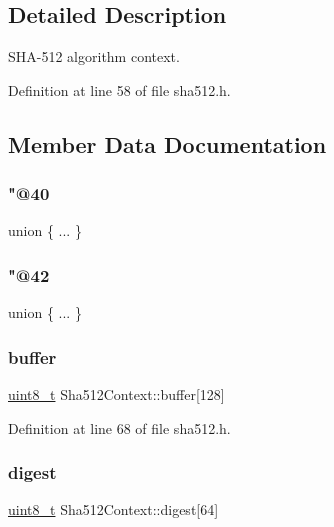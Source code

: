 \subsection{Detailed Description}
S\+H\+A-\/512 algorithm context. 

Definition at line 58 of file sha512.\+h.



\subsection{Member Data Documentation}
\mbox{\label{structSha512Context_ae58ba3548c1f12fa774f9316335b9272}} 
\subsubsection{\texorpdfstring{"@40}{@40}}
{\footnotesize\ttfamily union \{ ... \} }

\mbox{\label{structSha512Context_a4e5ca4c210ab1644179fec906141937e}} 
\subsubsection{\texorpdfstring{"@42}{@42}}
{\footnotesize\ttfamily union \{ ... \} }

\mbox{\label{structSha512Context_a5634ba203a8da22b12ddd1dd74089f37}} 
\subsubsection{\texorpdfstring{buffer}{buffer}}
{\footnotesize\ttfamily \hyperlink{stdint_8h_aba7bc1797add20fe3efdf37ced1182c5}{uint8\+\_\+t} Sha512\+Context\+::buffer\mbox{[}128\mbox{]}}



Definition at line 68 of file sha512.\+h.

\mbox{\label{structSha512Context_a132f046ba86d88873dd6a5b960e3bf8c}} 
\subsubsection{\texorpdfstring{digest}{digest}}
{\footnotesize\ttfamily \hyperlink{stdint_8h_aba7bc1797add20fe3efdf37ced1182c5}{uint8\+\_\+t} Sha512\+Context\+::digest\mbox{[}64\mbox{]}}



